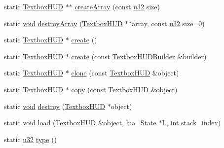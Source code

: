 \begin{DoxyCompactItemize}
\item 
static \mbox{\hyperlink{classnjli_1_1_textbox_h_u_d}{Textbox\+H\+UD}} $\ast$$\ast$ \mbox{\hyperlink{classnjli_1_1_textbox_h_u_d_a0d83157abc6c7cd42cc13fa0b3c946f1}{create\+Array}} (const \mbox{\hyperlink{_util_8h_a10e94b422ef0c20dcdec20d31a1f5049}{u32}} size)
\item 
static \mbox{\hyperlink{_thread_8h_af1e856da2e658414cb2456cb6f7ebc66}{void}} \mbox{\hyperlink{classnjli_1_1_textbox_h_u_d_ad3449d4687ff3cce19b3aaa5e6d415b0}{destroy\+Array}} (\mbox{\hyperlink{classnjli_1_1_textbox_h_u_d}{Textbox\+H\+UD}} $\ast$$\ast$array, const \mbox{\hyperlink{_util_8h_a10e94b422ef0c20dcdec20d31a1f5049}{u32}} size=0)
\item 
static \mbox{\hyperlink{classnjli_1_1_textbox_h_u_d}{Textbox\+H\+UD}} $\ast$ \mbox{\hyperlink{classnjli_1_1_textbox_h_u_d_a12780be5e88bf1829b91df685121d068}{create}} ()
\item 
static \mbox{\hyperlink{classnjli_1_1_textbox_h_u_d}{Textbox\+H\+UD}} $\ast$ \mbox{\hyperlink{classnjli_1_1_textbox_h_u_d_ab9ba8a1697760d225f60832f188c0310}{create}} (const \mbox{\hyperlink{classnjli_1_1_textbox_h_u_d_builder}{Textbox\+H\+U\+D\+Builder}} \&builder)
\item 
static \mbox{\hyperlink{classnjli_1_1_textbox_h_u_d}{Textbox\+H\+UD}} $\ast$ \mbox{\hyperlink{classnjli_1_1_textbox_h_u_d_a449d54db2ec81d190030f89307d79f8b}{clone}} (const \mbox{\hyperlink{classnjli_1_1_textbox_h_u_d}{Textbox\+H\+UD}} \&object)
\item 
static \mbox{\hyperlink{classnjli_1_1_textbox_h_u_d}{Textbox\+H\+UD}} $\ast$ \mbox{\hyperlink{classnjli_1_1_textbox_h_u_d_a761b8b5f3efea690284284784fea9581}{copy}} (const \mbox{\hyperlink{classnjli_1_1_textbox_h_u_d}{Textbox\+H\+UD}} \&object)
\item 
static \mbox{\hyperlink{_thread_8h_af1e856da2e658414cb2456cb6f7ebc66}{void}} \mbox{\hyperlink{classnjli_1_1_textbox_h_u_d_a1d75f71707ec7b6bfb42c774ef29bfca}{destroy}} (\mbox{\hyperlink{classnjli_1_1_textbox_h_u_d}{Textbox\+H\+UD}} $\ast$object)
\item 
static \mbox{\hyperlink{_thread_8h_af1e856da2e658414cb2456cb6f7ebc66}{void}} \mbox{\hyperlink{classnjli_1_1_textbox_h_u_d_af9804b35ec8560a6c9abd80e9bc78165}{load}} (\mbox{\hyperlink{classnjli_1_1_textbox_h_u_d}{Textbox\+H\+UD}} \&object, lua\+\_\+\+State $\ast$L, int stack\+\_\+index)
\item 
static \mbox{\hyperlink{_util_8h_a10e94b422ef0c20dcdec20d31a1f5049}{u32}} \mbox{\hyperlink{classnjli_1_1_textbox_h_u_d_ab31dc92abf94cdd2dbce4ac4d968b01c}{type}} ()
\end{DoxyCompactItemize}
